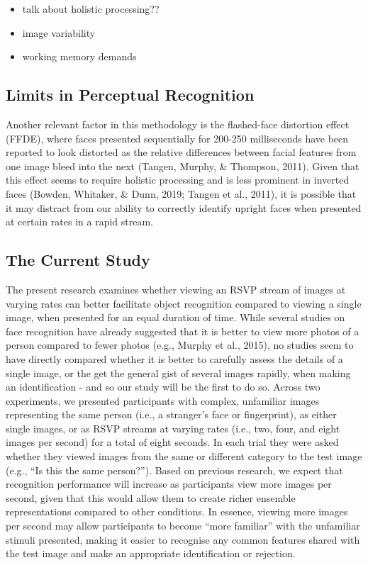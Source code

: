 \documentclass[
  english,
  man]{apa6}
\providecommand{\tightlist}{%
  \setlength{\itemsep}{0pt}\setlength{\parskip}{0pt}}
\begin{document}
\begin{itemize}
\tightlist
\item
  talk about holistic processing??
\item
  image variability
\item
  working memory demands
\end{itemize}

\hypertarget{limits-in-perceptual-recognition}{%
\subsection{Limits in Perceptual Recognition}\label{limits-in-perceptual-recognition}}

Another relevant factor in this methodology is the flashed-face distortion effect (FFDE), where faces presented sequentially for 200-250 milliseconds have been reported to look distorted as the relative differences between facial features from one image bleed into the next (Tangen, Murphy, \& Thompson, 2011). Given that this effect seems to require holistic processing and is less prominent in inverted faces (Bowden, Whitaker, \& Dunn, 2019; Tangen et al., 2011), it is possible that it may distract from our ability to correctly identify upright faces when presented at certain rates in a rapid stream.

\hypertarget{the-current-study}{%
\subsection{The Current Study}\label{the-current-study}}

The present research examines whether viewing an RSVP stream of images at varying rates can better facilitate object recognition compared to viewing a single image, when presented for an equal duration of time. While several studies on face recognition have already suggested that it is better to view more photos of a person compared to fewer photos (e.g., Murphy et al., 2015), no studies seem to have directly compared whether it is better to carefully assess the details of a single image, or the get the general gist of several images rapidly, when making an identification - and so our study will be the first to do so. Across two experiments, we presented participants with complex, unfamiliar images representing the same person (i.e., a stranger's face or fingerprint), as either single images, or as RSVP streams at varying rates (i.e., two, four, and eight images per second) for a total of eight seconds. In each trial they were asked whether they viewed images from the same or different category to the test image (e.g., ``Is this the same person?''). Based on previous research, we expect that recognition performance will increase as participants view more images per second, given that this would allow them to create richer ensemble representations compared to other conditions. In essence, viewing more images per second may allow participants to become ``more familiar'' with the unfamiliar stimuli presented, making it easier to recognise any common features shared with the test image and make an appropriate identification or rejection.
\end{document}
